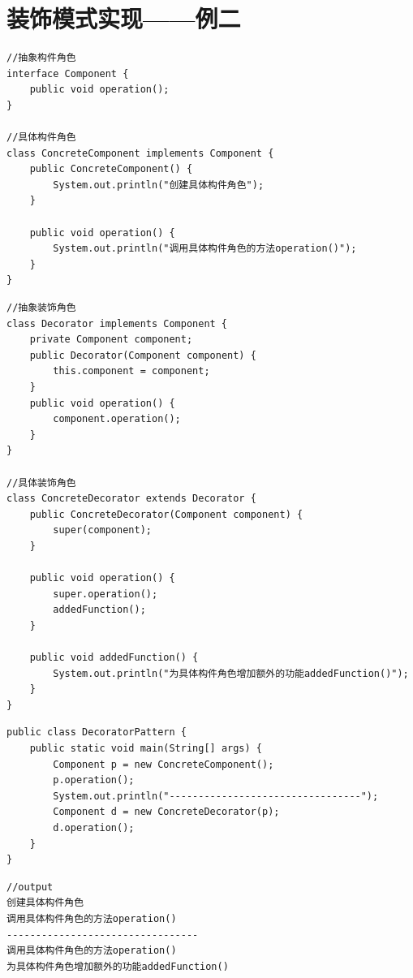 \section{装饰模式实现——例二}
\begin{lstlisting}
//抽象构件角色
interface Component {
	public void operation();
}

//具体构件角色
class ConcreteComponent implements Component {
	public ConcreteComponent() {
		System.out.println("创建具体构件角色");
	}
	
	public void operation() {
		System.out.println("调用具体构件角色的方法operation()");
	}
}
\end{lstlisting}
\begin{lstlisting}
//抽象装饰角色
class Decorator implements Component {
	private Component component;
	public Decorator(Component component) {
		this.component = component;
	}
	public void operation() {
		component.operation();
	}
}

//具体装饰角色
class ConcreteDecorator extends Decorator {
	public ConcreteDecorator(Component component) {
		super(component);
	}
	
	public void operation() {
		super.operation();
		addedFunction();
	}
	
	public void addedFunction() {
		System.out.println("为具体构件角色增加额外的功能addedFunction()");
	}
}
\end{lstlisting}
\begin{lstlisting}
public class DecoratorPattern {
	public static void main(String[] args) {
		Component p = new ConcreteComponent();
		p.operation();
		System.out.println("---------------------------------");
		Component d = new ConcreteDecorator(p);
		d.operation();
	}
}
\end{lstlisting}
\begin{lstlisting}
//output
创建具体构件角色
调用具体构件角色的方法operation()
---------------------------------
调用具体构件角色的方法operation()
为具体构件角色增加额外的功能addedFunction()
\end{lstlisting}
